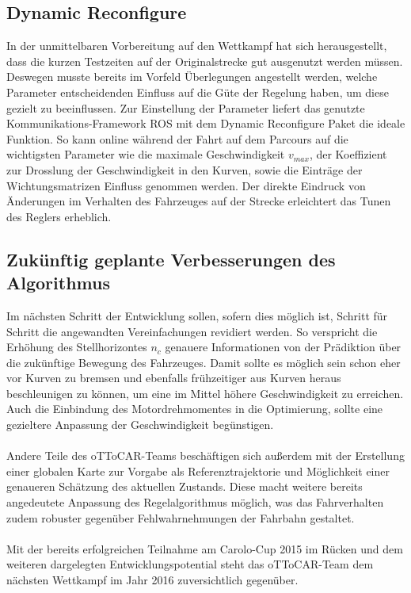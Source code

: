 \subsection{Dynamic Reconfigure}
In der unmittelbaren Vorbereitung auf den Wettkampf hat sich herausgestellt, dass die kurzen Testzeiten auf der Originalstrecke gut ausgenutzt werden müssen. Deswegen musste bereits im Vorfeld Überlegungen angestellt werden, welche Parameter entscheidenden Einfluss auf die Güte der Regelung haben, um diese gezielt zu beeinflussen. Zur Einstellung der Parameter liefert das genutzte Kommunikations-Framework ROS mit dem Dynamic Reconfigure Paket die ideale Funktion. So kann online während der Fahrt auf dem Parcours auf die wichtigsten Parameter wie die maximale Geschwindigkeit $v_{max}$, der Koeffizient zur Drosslung der Geschwindigkeit in den Kurven, sowie die Einträge der Wichtungsmatrizen Einfluss genommen werden. Der direkte Eindruck von Änderungen im Verhalten des Fahrzeuges auf der Strecke erleichtert das Tunen des Reglers erheblich.
\subsection{Zukünftig geplante Verbesserungen des Algorithmus}
Im nächsten Schritt der Entwicklung sollen, sofern dies möglich ist, Schritt für Schritt die angewandten Vereinfachungen revidiert werden. So verspricht die Erhöhung des Stellhorizontes $n_c$ genauere Informationen von der Prädiktion über die zukünftige Bewegung des Fahrzeuges. Damit sollte es möglich sein schon eher vor Kurven zu bremsen und ebenfalls frühzeitiger aus Kurven heraus beschleunigen zu können, um eine im Mittel höhere Geschwindigkeit zu erreichen. Auch die Einbindung des Motordrehmomentes in die Optimierung, sollte eine gezieltere Anpassung der Geschwindigkeit begünstigen.\\ \\ 
Andere Teile des oTToCAR-Teams beschäftigen sich außerdem mit der Erstellung einer globalen Karte zur Vorgabe als Referenztrajektorie und Möglichkeit einer genaueren Schätzung des aktuellen Zustands. Diese macht weitere bereits angedeutete Anpassung des Regelalgorithmus möglich, was das Fahrverhalten zudem robuster gegenüber Fehlwahrnehmungen der Fahrbahn gestaltet.\\ \\
Mit der bereits erfolgreichen Teilnahme am Carolo-Cup 2015 im Rücken und dem weiteren dargelegten Entwicklungspotential steht das oTToCAR-Team dem nächsten Wettkampf im Jahr 2016 zuversichtlich gegenüber.